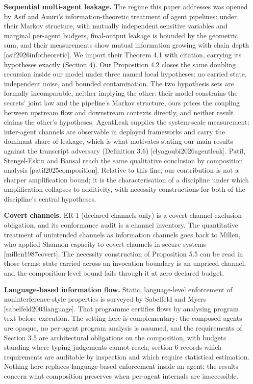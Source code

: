 \documentclass[
  11pt,
]{article}
\begin{document}
\textbf{Sequential multi-agent leakage.} The regime this paper addresses
was opened by Asif and Amiri's information-theoretic treatment of agent
pipelines: under their Markov structure, with mutually independent
sensitive variables and marginal per-agent budgets, final-output leakage
is bounded by the geometric sum, and their measurements show mutual
information growing with chain depth {[}asif2026infotheoretic{]}. We
import their Theorem 4.1 with citation, carrying its hypotheses exactly
(Section 4). Our Proposition 4.2 closes the same doubling recursion
inside our model under three named local hypotheses: no carried state,
independent noise, and bounded contamination. The two hypothesis sets
are formally incomparable, neither implying the other: their model
constrains the secrets' joint law and the pipeline's Markov structure,
ours prices the coupling between upstream flow and downstream contexts
directly, and neither result claims the other's hypotheses. AgentLeak
supplies the system-scale measurement: inter-agent channels are
observable in deployed frameworks and carry the dominant share of
leakage, which is what motivates stating our main results against the
transcript adversary (Definition 3.6) {[}elyagoubi2026agentleak{]}.
Patil, Stengel-Eskin and Bansal reach the same qualitative conclusion by
composition analysis {[}patil2025composition{]}. Relative to this line,
our contribution is not a sharper amplification bound; it is the
characterisation of a discipline under which amplification collapses to
additivity, with necessity constructions for both of the discipline's
central hypotheses.

\textbf{Covert channels.} ER-1 (declared channels only) is a
covert-channel exclusion obligation, and its conformance audit is a
channel inventory. The quantitative treatment of unintended channels as
information channels goes back to Millen, who applied Shannon capacity
to covert channels in secure systems {[}millen1987covert{]}. The
necessity construction of Proposition 5.5 can be read in those terms:
state carried across an invocation boundary is an unpriced channel, and
the composition-level bound fails through it at zero declared budget.

\textbf{Language-based information flow.} Static, language-level
enforcement of noninterference-style properties is surveyed by Sabelfeld
and Myers {[}sabelfeld2003language{]}. That programme certifies flows by
analysing program text before execution. The setting here is
complementary: the composed agents are opaque, no per-agent program
analysis is assumed, and the requirements of Section 3.5 are
architectural obligations on the composition, with budgets standing
where typing judgements cannot reach; section 6 records which
requirements are auditable by inspection and which require statistical
estimation. Nothing here replaces language-based enforcement inside an
agent; the results concern what composition preserves when per-agent
internals are inaccessible.
\end{document}
